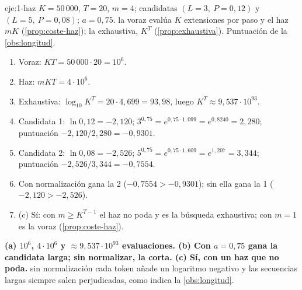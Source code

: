 \begin{solucion}{eje:1-haz}
\datos $K=50\,000$, $T=20$, $m=4$; candidatas $(L=3,\ P=0{,}12)$ y $(L=5,\ P=0{,}08)$; $a=0{,}75$.
\planteamiento la voraz evalúa $K$ extensiones por paso y el haz $mK$ (\cref{prop:coste-haz}); la exhaustiva, $K^{T}$ (\cref{prop:exhaustiva}). Puntuación de la \cref{obs:longitud}.
\pasos
\begin{enumerate}[label=\arabic*.]
  \item Voraz: $KT=50\,000\cdot 20=10^{6}$.
  \item Haz: $mKT=4\cdot 10^{6}$.
  \item Exhaustiva: $\log_{10}K^{T}=20\cdot 4{,}699=93{,}98$, luego $K^{T}\approx 9{,}537\cdot 10^{93}$.
  \item Candidata 1: $\ln 0{,}12=-2{,}120$; $3^{0{,}75}=e^{0{,}75\cdot 1{,}099}=e^{0{,}8240}=2{,}280$; puntuación $-2{,}120/2{,}280=-0{,}9301$.
  \item Candidata 2: $\ln 0{,}08=-2{,}526$; $5^{0{,}75}=e^{0{,}75\cdot 1{,}609}=e^{1{,}207}=3{,}344$; puntuación $-2{,}526/3{,}344=-0{,}7554$.
  \item Con normalización gana la 2 ($-0{,}7554>-0{,}9301$); sin ella gana la 1 ($-2{,}120>-2{,}526$).
  \item (c) Sí: con $m\ge K^{T-1}$ el haz no poda y es la búsqueda exhaustiva; con $m=1$ es la voraz (\cref{prop:coste-haz}).
\end{enumerate}
\resultado \textbf{(a) $10^{6}$, $4\cdot 10^{6}$ y $\approx 9{,}537\cdot 10^{93}$ evaluaciones. (b) Con $a=0{,}75$ gana la candidata larga; sin normalizar, la corta. (c) Sí, con un haz que no poda.}
\comprobacion sin normalización cada token añade un logaritmo negativo y las secuencias largas siempre salen perjudicadas, como indica la \cref{obs:longitud}.
\end{solucion}

